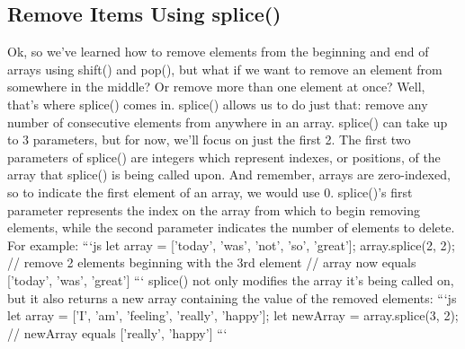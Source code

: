 \documentclass{article}%
\begin{document}
\subsection{Remove Items Using splice()}%
\label{subsec:RemoveItemsUsingsplice()}%
Ok, so we've learned how to remove elements from the beginning and end of arrays using shift() and pop(), but what if we want to remove an element from somewhere in the middle? Or remove more than one element at once? Well, that's where splice() comes in. splice() allows us to do just that: remove any number of consecutive elements from anywhere in an array.\newline%
splice() can take up to 3 parameters, but for now, we'll focus on just the first 2. The first two parameters of splice() are integers which represent indexes, or positions, of the array that splice() is being called upon. And remember, arrays are zero{-}indexed, so to indicate the first element of an array, we would use 0. splice()'s first parameter represents the index on the array from which to begin removing elements, while the second parameter indicates the number of elements to delete. For example:\newline%
```js\newline%
let array = {[}'today', 'was', 'not', 'so', 'great'{]};\newline%
array.splice(2, 2);\newline%
// remove 2 elements beginning with the 3rd element\newline%
// array now equals {[}'today', 'was', 'great'{]}\newline%
```\newline%
splice() not only modifies the array it's being called on, but it also returns a new array containing the value of the removed elements:\newline%
```js\newline%
let array = {[}'I', 'am', 'feeling', 'really', 'happy'{]};\newline%
let newArray = array.splice(3, 2);\newline%
// newArray equals {[}'really', 'happy'{]}\newline%
```\newline%

%
\end{document}
